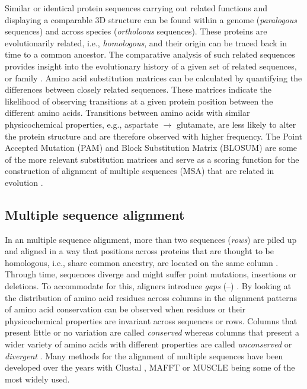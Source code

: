 Similar or identical protein sequences carrying out related functions and displaying a comparable 3D structure can be found within a genome (\textit{paralogous} sequences) and across species (\textit{ortholoous} sequences). These proteins are evolutionarily related, i.e., \textit{homologous}, and their origin can be traced back in time to a common ancestor. The comparative analysis of such related sequences provides insight into the evolutionary history of a given set of related sequences, or family \cite{BARTON_1990_MSA}. Amino acid substitution matrices can be calculated by quantifying the differences between closely related sequences. These matrices indicate the likelihood of observing transitions at a given protein position between the different amino acids. Transitions between amino acids with similar physicochemical properties, e.g., aspartate $\rightarrow$ glutamate, are less likely to alter the protein structure and are therefore observed with higher frequency. The Point Accepted Mutation (PAM) \cite{DAYHOFF_1978_PAM} and Block Substitution Matrix (BLOSUM) \cite{HENIKOFF_1992_BLOSUM} are some of the more relevant substitution matrices and serve as a scoring function for the construction of alignment of multiple sequences (MSA) that are related in evolution \cite{BARTON_1987_MSA}.

\subsection{Multiple sequence alignment}

In an multiple sequence alignment, more than two sequences (\textit{rows}) are piled up and aligned in a way that positions across proteins that are thought to be homologous, i.e., share common ancestry, are located on the same column \cite{NEEDLEMAN_1970_MSA}. Through time, sequences diverge and might suffer point mutations, insertions or deletions. To accommodate for this, aligners introduce \textit{gaps} (--) \cite{SMITH_1981_MSA}. By looking at the distribution of amino acid residues across columns in the alignment patterns of amino acid conservation can be observed when residues or their physicochemical properties are invariant across sequences or rows. Columns that present little or no variation are called \textit{conserved} whereas columns that present a wider variety of amino acids with different properties are called \textit{unconserved} or \textit{divergent} \cite{LIVINGSTONE_1993_CONS}. Many methods for the alignment of multiple sequences have been developed over the years with Clustal \cite{HIGGINS_1988_CLUSTAL, HIGGINS_1992_CLUSTALV, THOMPSON_1994_CLUSTALW, JEANMOUGIN_1998_CLUSTALX, SIEVERS_2011_CLUSTALO}, MAFFT \cite{KATOH_2002_MAFFT, KATOH_2008_MAFFT, KATOH_2013_MAFFT} or MUSCLE \cite{EDGAR_2004_MUSCLE, EDGAR_2022_MUSCLE5} being some of the most widely used.

